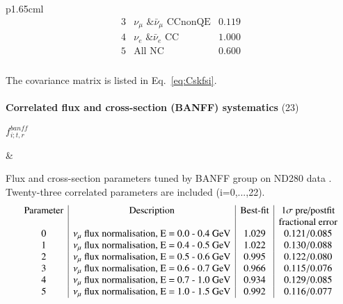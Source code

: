 {\begin{longtable}{p{1.65cm}l}
{$${\begin{array}{c|c|c}
            3 &  \nu_\mu \text{ \& } \bar{\nu}_{\mu} \text{ CCnonQE}                                                        & 0.119   \\
            4 &  \nu_e \text{ \& } \bar{\nu}_{e} \text{ CC}                                                                 & 1.000   \\
            5 &  \text{All NC}                                                                                              & 0.600   \\
         \end{array} }
    $$\\
    The covariance matrix is listed in Eq.\ \ref{eq:Cskfsi}.\\
    \vspace{0.2cm}
  }
\\
%
%
\hline
{} { {\bf Correlated flux and cross-section (BANFF) systematics} (23)} \\
\hline
  \parbox{0.15\textwidth}
  {
     $f_{i; t, r}^{banff}$
  }
&
  \parbox{0.81\textwidth}
  {
    \vspace{0.2cm}
    Flux and cross-section parameters tuned by BANFF group on ND280 data \cite{BANFF2013}. 
    Twenty-three correlated parameters are included (i=0,...,22).\\
    $$     
        {
         \renewcommand{\arraystretch}{1.0} %
         \begin{array}{c|c|c|c}
           \text{Parameter} & \text{Description} & \text{Best-fit} & 1\sigma \text{ pre/postfit} \\
           & & & \text{fractional error} \\
            0 &  \nu_\mu \text{ flux normalisation, E = 0.0 - 0.4 GeV}          & 1.029 & 0.121 / 0.085 \\
            1 &  \nu_\mu \text{ flux normalisation, E = 0.4 - 0.5 GeV}          & 1.022 & 0.130 / 0.088 \\
            2 &  \nu_\mu \text{ flux normalisation, E = 0.5 - 0.6 GeV}          & 0.995 & 0.122 / 0.080 \\
            3 &  \nu_\mu \text{ flux normalisation, E = 0.6 - 0.7 GeV}          & 0.966 & 0.115 / 0.076 \\
            4 &  \nu_\mu \text{ flux normalisation, E = 0.7 - 1.0 GeV}          & 0.934 & 0.129 / 0.085 \\
            5 &  \nu_\mu \text{ flux normalisation, E = 1.0 - 1.5 GeV}          & 0.992 & 0.116 / 0.077 \\

\end{array}}$$}
\end{longtable}}
